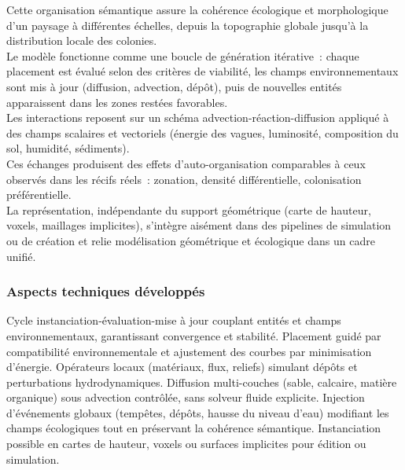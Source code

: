 Cette organisation sémantique assure la cohérence écologique et morphologique d'un paysage à différentes échelles, depuis la topographie globale jusqu'à la distribution locale des colonies. \\
Le modèle fonctionne comme une boucle de génération itérative~: chaque placement est évalué selon des critères de viabilité, les champs environnementaux sont mis à jour (diffusion, advection, dépôt), puis de nouvelles entités apparaissent dans les zones restées favorables. \\
Les interactions reposent sur un schéma advection-réaction-diffusion appliqué à des champs scalaires et vectoriels (énergie des vagues, luminosité, composition du sol, humidité, sédiments). \\
Ces échanges produisent des effets d'auto-organisation comparables à ceux observés dans les récifs réels~: zonation, densité différentielle, colonisation préférentielle. \\
La représentation, indépendante du support géométrique (carte de hauteur, voxels, maillages implicites), s'intègre aisément dans des pipelines de simulation ou de création et relie modélisation géométrique et écologique dans un cadre unifié.

\subsubsection*{Aspects techniques développés}
\begin{Itemize}
     Cycle instanciation-évaluation-mise à jour couplant entités et champs environnementaux, garantissant convergence et stabilité.
     Placement guidé par compatibilité environnementale et ajustement des courbes par minimisation d'énergie.
     Opérateurs locaux (matériaux, flux, reliefs) simulant dépôts et perturbations hydrodynamiques.
     Diffusion multi-couches (sable, calcaire, matière organique) sous advection contrôlée, sans solveur fluide explicite.
     Injection d'événements globaux (tempêtes, dépôts, hausse du niveau d'eau) modifiant les champs écologiques tout en préservant la cohérence sémantique.
     Instanciation possible en cartes de hauteur, voxels ou surfaces implicites pour édition ou simulation.
\end{Itemize}


